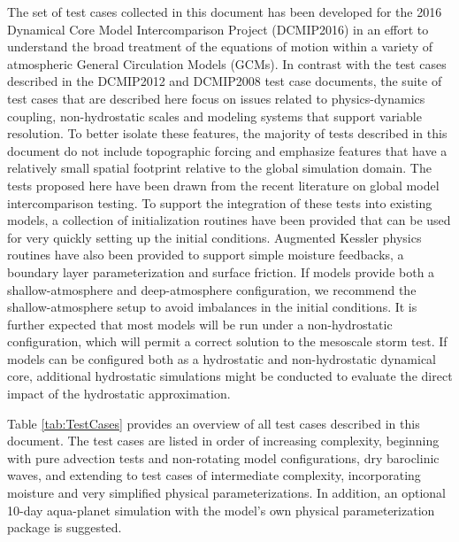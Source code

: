 \documentclass[times,doublespace]{fldauth}
\begin{document}
The set of test cases collected in this document has been developed for the 2016 Dynamical Core Model Intercomparison Project (DCMIP2016) in an effort to understand the broad treatment of the equations of motion within a variety of atmospheric General Circulation Models (GCMs). In contrast with the test cases described in the DCMIP2012 and DCMIP2008 test case documents, the suite of test cases that are described here focus on issues related to physics-dynamics coupling, non-hydrostatic scales and modeling systems that support variable resolution.  To better isolate these features, the majority of tests described in this document do not include topographic forcing and emphasize features that have a relatively small spatial footprint relative to the global simulation domain.  The tests proposed here have been drawn from the recent literature on global model intercomparison testing.  To support the integration of these tests into existing models, a collection of initialization routines have been provided that can be used for very quickly setting up the initial conditions.  Augmented Kessler physics routines have also been provided to support simple moisture feedbacks, a boundary layer parameterization and surface friction.  If models provide both a shallow-atmosphere and deep-atmosphere configuration, we recommend the shallow-atmosphere setup to avoid imbalances in the initial conditions. It is further expected that most models will be run under a non-hydrostatic configuration, which will permit a correct solution to the mesoscale storm test.  If models can be configured both as a hydrostatic and non-hydrostatic dynamical core, additional hydrostatic simulations might be conducted to evaluate the direct impact of the hydrostatic approximation.

Table \ref{tab:TestCases} provides an overview of all test cases described in this document.  The test cases are listed in order of increasing complexity, beginning with pure advection tests and non-rotating model configurations, dry baroclinic waves, and extending to test cases of intermediate complexity, incorporating moisture and very simplified physical parameterizations. In addition, an optional 10-day aqua-planet simulation with the model's own physical parameterization package is suggested. 
\end{document}
